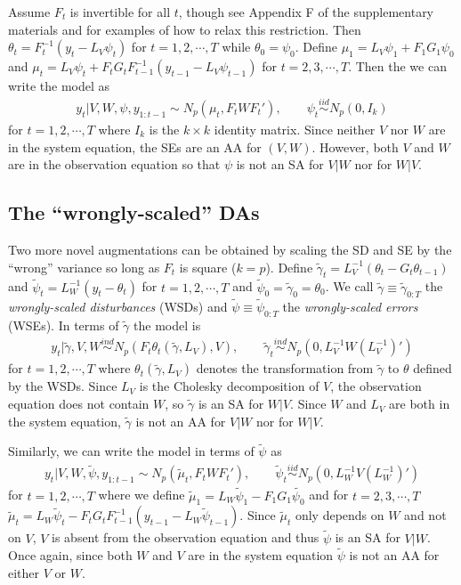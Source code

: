 \documentclass[12pt]{article}
\begin{document}
Assume $F_t$ is invertible for all $t$, though see Appendix F of the supplementary materials and \blind \citet{simpson2014app} \fi for examples of how to relax this restriction. Then $\theta_t = F_t^{-1}(y_t - L_V\psi_t)$ for $t=1,2,\cdots,T$ while $\theta_0=\psi_0$. Define $\mu_1 = L_V\psi_1 + F_1G_1\psi_0$ and $\mu_t =L_V\psi_t + F_tG_tF_{t-1}^{-1}(y_{t-1} - L_{V}\psi_{t-1})$ for $t=2,3,\cdots,T$. Then the we can write the model as
\begin{align*}
  y_t|V,W,\psi,y_{1:t-1} \sim N_p(\mu_t, F_tWF_t'), \qquad \psi_t  \stackrel{iid}{\sim} N_p(0,I_k)
\end{align*}
for $t=1,2,\cdots,T$ where $I_k$ is the $k\times k$ identity matrix. Since neither $V$ nor $W$ are in the system equation, the SEs are an AA for $(V,W)$. However, both $V$ and $W$ are in the observation equation so that $\psi$ is not an SA for $V|W$ nor for $W|V$.

\subsection{The ``wrongly-scaled'' DAs}
Two more novel augmentations can be obtained by scaling the SD and SE by the ``wrong'' variance so long as $F_t$ is square ($k=p$). Define $\tilde{\gamma}_t=L_V^{-1}(\theta_t - G_t\theta_{t-1})$ and $\tilde{\psi}_t=L_W^{-1}(y_t - \theta_t)$ for $t=1,2,\cdots,T$ and $\tilde{\psi}_0=\tilde{\gamma}_0=\theta_0$. We call $\tilde{\gamma}\equiv\tilde{\gamma}_{0:T}$ the {\it wrongly-scaled disturbances} (WSDs) and $\tilde{\psi}\equiv\tilde{\psi}_{0:T}$ the {\it wrongly-scaled errors} (WSEs). In terms of $\tilde{\gamma}$ the model is
\begin{align*}
  y_t|\tilde{\gamma},V,W \stackrel{ind}{\sim} N_p\left(F_t\theta_t(\tilde{\gamma},L_V), V\right), \qquad  
  \tilde{\gamma}_t \stackrel{ind}{\sim}N_p(0,L_V^{-1}W(L_V^{-1})')
\end{align*}
for $t=1,2,\cdots,T$ where $\theta_t(\tilde{\gamma},L_V)$ denotes the transformation from $\tilde{\gamma}$ to $\theta$ defined by the WSDs. Since $L_V$ is the Cholesky decomposition of $V$, the observation equation does not contain $W$, so $\tilde{\gamma}$ is an SA for $W|V$. Since $W$ and $L_V$ are both in the system equation, $\tilde{\gamma}$ is not an AA for $V|W$ nor for $W|V$. 

Similarly, we can write the model in terms of $\tilde{\psi}$ as
\begin{align*}
  y_t|V,W,\tilde{\psi},y_{1:t-1} \sim N_p(\tilde{\mu}_t, F_tWF_t'), \qquad 
  \tilde{\psi}_t  \stackrel{iid}{\sim} N_p(0,L_W^{-1}V(L_W^{-1})')
\end{align*}
for $t=1,2,\cdots,T$ where we define $\tilde{\mu}_1 = L_W\tilde{\psi}_1 - F_1G_1\tilde{\psi_0}$ and for $t=2,3,\cdots,T$ $\tilde{\mu}_t =L_W\tilde{\psi}_t - F_tG_tF_{t-1}^{-1}(y_{t-1} - L_{W}\tilde{\psi}_{t-1})$. Since $\tilde{\mu}_t$ only depends on $W$ and not on $V$, $V$ is absent from the observation equation and thus $\tilde{\psi}$ is an SA for $V|W$. Once again, since both $W$ and $V$ are in the system equation $\tilde{\psi}$ is not an AA for either $V$ or $W$.
\end{document}
